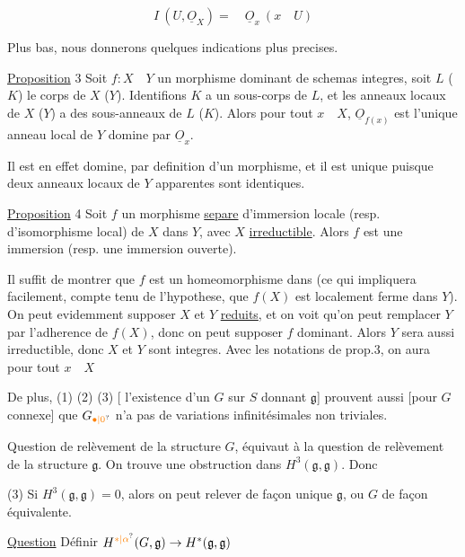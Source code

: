 \[
I\ (U,\underline O_X)=\quad\underline O_x\ (x\quad U)
\]

Plus bas, nous donnerons quelques indications plus precises.

\uline{Proposition} 3 Soit \(f:X\quad Y\) un morphisme dominant de schemas integres,  soit \(L\) (\(K\)) le corps de \(X\) (\(Y\)). Identifions \(K\) a un sous-corps de \(L\), et les anneaux locaux de \(X\) (\(Y\)) a des sous-anneaux de \(L\) (\(K\)). Alors pour tout \(x\quad X\), \(\underline O_{f(x)}\) est l'unique anneau local de \(Y\) domine par \(\underline O_x\).

Il est en effet domine, par definition d'un morphisme, et il est unique puisque deux anneaux locaux de \(Y\) apparentes sont identiques.

\uline{Proposition} 4 Soit \(f\) un morphisme \uline{separe} d'immersion locale (resp. d'isomorphisme local) de \(X\) dans \(Y\), avec  \(X\) \uline{irreductible}. Alors \(f\) est une immersion (resp. une immersion ouverte).

Il suffit de montrer que \(f\) est un homeomorphisme dans (ce qui impliquera facilement, compte tenu de l'hypothese, que \(f(X)\) est localement ferme dans \(Y\)). On peut evidemment supposer \(X\) et \(Y\) \uline{reduits}, et on voit qu'on peut remplacer \(Y\) par l'adherence de \(f(X)\), donc on peut supposer \(f\) dominant. Alors  \(Y\) sera aussi irreductible, donc \(X\) et \(Y\) sont integres. Avec les notations de prop.3, on aura pour tout \(x\quad X\)

De plus, (1) (2) (3) [ l'existence d'un \(G\)  sur \(S\) donnant \(\mathfrak g\)] prouvent aussi [pour \(G\) connexe] que \(G_{\unsure{\bullet|0}}\) n'a pas de variations infinitésimales non triviales.

Question de relèvement de la structure \(G\), équivaut à la question de relèvement de la structure \(\mathfrak g\). On trouve une obstruction dans \(H^3(\mathfrak g,\mathfrak g)\). Donc


(3) Si \(H^3(\mathfrak g,\mathfrak g)=0\), alors on peut relever de façon  unique \(\mathfrak g\), ou \(G\) de façon équivalente.

\uline{Question} Définir \(H^{\unsure{*|\alpha}}(G,\mathfrak g)\to H^*(\mathfrak g,\mathfrak g)\)

